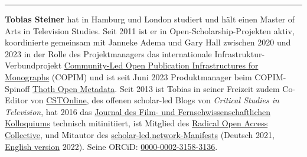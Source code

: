 \begin{center}\rule{0.5\linewidth}{0.5pt}\end{center}

\textbf{Tobias Steiner} hat in Hamburg und London studiert und hält
einen Master of Arts in Television Studies. Seit 2011 ist er in
Open-Scholarship-Projekten aktiv, koordinierte gemeinsam mit Janneke
Adema und Gary Hall zwischen 2020 und 2023 in der Rolle des
Projektmanagers das internationale Infrastruktur-Verbundprojekt
\href{https://www.copim.ac.uk}{Community-Led Open Publication
Infrastructures for Monographs} (COPIM) und ist seit Juni 2023
Produktmanager beim COPIM-Spinoff \href{https://thoth.pub/}{Thoth Open
Metadata}. Seit 2013 ist Tobias in seiner Freizeit zudem Co-Editor von
\href{https://cstonline.net/}{CSTOnline}, des offenen scholar-led Blogs
von \emph{Critical Studies in Television}, hat 2016 das
\href{http://ffk-journal.de/}{Journal des Film- und
Fernsehwissenschaftlichen Kolloquiums} technisch mitinitiiert, ist
Mitglied des \href{https://radicaloa.disruptivemedia.org.uk/}{Radical
Open Access Collective}, und Mitautor des
\href{https://graphite.page/scholar-led-manifest/}{scholar-led.network-Manifests}
(Deutsch 2021,
\href{https://graphite.page/scholar-led-manifesto/}{English version}
2022). Seine ORCiD:
\href{https://orcid.org/0000-0002-3158-3136}{0000-0002-3158-3136}.
